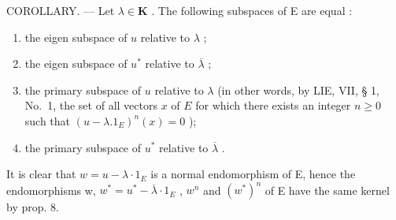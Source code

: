 COROLLARY. --- Let \(\lambda \in \mathbf{K}\) . The following subspaces of E are equal :

\begin{enumerate}
\def\labelenumi{\alph{enumi})}
\item
  the eigen subspace of \(u\) relative to \(\lambda\) ;
\item
  the eigen subspace of \(u^{*}\) relative to \(\overline{\lambda}\) ;
\item
  the primary subspace of \(u\) relative to \(\lambda\) (in other words, by LIE, VII, § 1, No.~1, the set of all vectors \(x\) of \(E\) for which there exists an integer \(n \geqslant 0\) such that \((u - \lambda .1_{E})^{n}(x) = 0\) );
\item
  the primary subspace of \(u^{*}\) relative to \(\overline{\lambda}\) .
\end{enumerate}

It is clear that \(w = u - \lambda \cdot 1_{E}\) is a normal endomorphism of E, hence the endomorphisms w, \(w^{*} = u^{*} - \overline{\lambda} \cdot 1_{E}\) , \(w^{n}\) and \((w^{*})^{n}\) of E have the same kernel by prop. 8.

